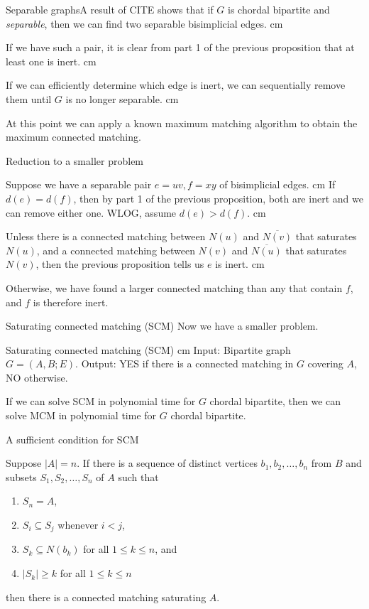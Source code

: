 \documentclass{beamer}
\newcommand{\bframe}[2]{\begin{frame}{#1}#2\end{frame}}
\begin{document}
\bframe{Separable graphs}{A result of CITE shows that if $G$ is chordal bipartite and {\it separable}, then we can find two separable bisimplicial edges.  \pause\vskip 0.5 cm

If we have such a pair, it is clear from part 1 of the previous proposition that at least one is inert. \pause\vskip 0.5 cm

If we can efficiently determine which edge is inert, we can sequentially remove them until $G$ is no longer separable. \pause \vskip 0.5 cm

At this point we can apply a known maximum matching algorithm to obtain the maximum connected matching.
 }

\bframe{Reduction to a smaller problem}{

Suppose we have a separable pair $e = uv, f = xy$ of bisimplicial edges.\pause\vskip 0.5 cm
If $d(e) = d(f)$, then by part 1 of the previous proposition, both are inert and we can remove either one. \pause WLOG, assume $d(e) > d(f)$.  \pause \vskip 0.5 cm

Unless there is a connected matching between $N(u)$ and $\overline{N(v)}$ that saturates $N(u)$, and a connected matching between $N(v)$ and $\overline{N(u)}$ that saturates $N(v)$, then the previous proposition tells us $e$ is inert.\pause\vskip 0.5 cm

Otherwise, we have found a larger connected matching than any that contain $f$, and $f$ is therefore inert.

}

\bframe{Saturating connected matching (SCM)}{
Now we have a smaller problem. \pause
\begin{framed}
  		Saturating connected matching (SCM)
  		\vskip 0.25 cm Input: Bipartite graph $G = (A, B;E)$.
  		\newline Output: YES if there is a connected matching in $G$ covering $A$, NO otherwise.
 	\end{framed}\pause

If we can solve SCM in polynomial time for $G$ chordal bipartite, then we can solve MCM in polynomial time for $G$ chordal bipartite.
}

\bframe{A sufficient condition for SCM}{
 
Suppose $|A| =n$.  \pause If there is a sequence of distinct vertices $b_1, b_2, \ldots, b_n$ from $B$ and subsets $S_1, S_2, \ldots ,S_n$ of $A$ such that\pause
	\begin{enumerate} 
		\item $S_n = A$, \pause
		\item $S_i \subseteq S_j$ whenever $i < j$, \pause
		\item $S_k \subseteq N(b_k)$ for all $1 \leq k \leq n$, and\pause
		\item $|S_k| \geq k$ for all $1 \leq k \leq n$\pause
	\end{enumerate}
then there is a connected matching saturating $A$.
}
\end{document}
